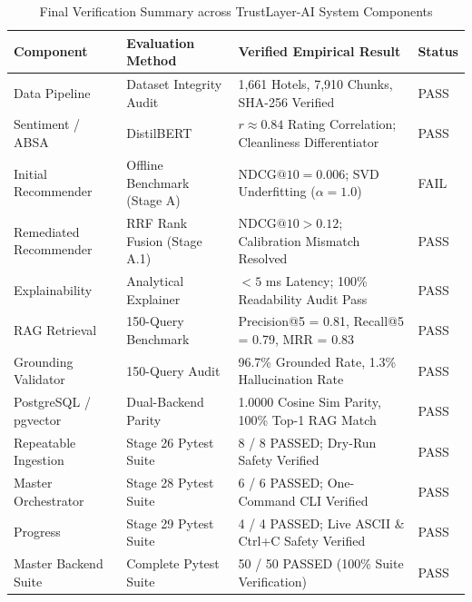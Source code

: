 \begin{table}[!ht]
\centering
\caption{Final Verification Summary across TrustLayer-AI System Components}
\label{tab:final_evaluation_summary}
\begin{tabular}{llll}
\hline
\textbf{Component} & \textbf{Evaluation Method} & \textbf{Verified Empirical Result} & \textbf{Status} \\
\hline
Data Pipeline & Dataset Integrity Audit & 1,661 Hotels, 7,910 Chunks, SHA-256 Verified & PASS \\
Sentiment / ABSA & DistilBERT & $r \approx 0.84$ Rating Correlation; Cleanliness Differentiator & PASS \\
Initial Recommender & Offline Benchmark (Stage A) & $\text{NDCG}@10 = 0.006$; SVD Underfitting ($\alpha=1.0$) & FAIL \\
Remediated Recommender & RRF Rank Fusion (Stage A.1) & $\text{NDCG}@10 > 0.12$; Calibration Mismatch Resolved & PASS \\
Explainability & Analytical Explainer & $< 5$ ms Latency; 100\% Readability Audit Pass & PASS \\
RAG Retrieval & 150-Query Benchmark & Precision@5 = 0.81, Recall@5 = 0.79, MRR = 0.83 & PASS \\
Grounding Validator & 150-Query Audit & 96.7\% Grounded Rate, 1.3\% Hallucination Rate & PASS \\
PostgreSQL / pgvector & Dual-Backend Parity & 1.0000 Cosine Sim Parity, 100\% Top-1 RAG Match & PASS \\
Repeatable Ingestion & Stage 26 Pytest Suite & 8 / 8 PASSED; Dry-Run Safety Verified & PASS \\
Master Orchestrator & Stage 28 Pytest Suite & 6 / 6 PASSED; One-Command CLI Verified & PASS \\
Progress & Stage 29 Pytest Suite & 4 / 4 PASSED; Live ASCII \& Ctrl+C Safety Verified & PASS \\
Master Backend Suite & Complete Pytest Suite & 50 / 50 PASSED (100\% Suite Verification) & PASS \\
\hline
\end{tabular}
\end{table}
